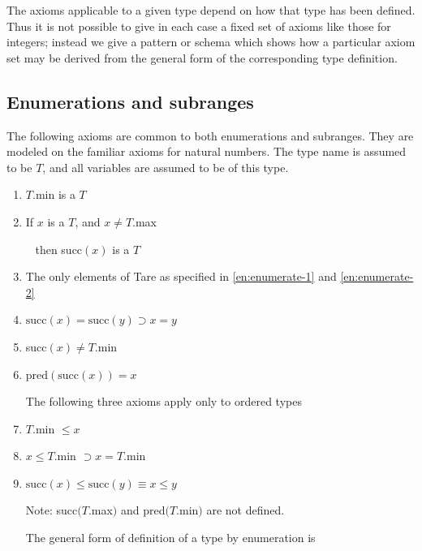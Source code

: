 \documentclass[twoside,11pt]{book}
\begin{document}
The axioms applicable to a given type depend on how that type has been defined. Thus it is not possible to give in each case a fixed set of axioms like those for integers; instead we give a pattern or schema which shows how a particular axiom set may be derived from the general form of the corresponding type definition.

\subsection{Enumerations and subranges}

The following axioms are common to both enumerations and subranges. They are modeled on the familiar axioms for natural numbers. The type name is assumed to be $T$, and all variables are assumed to be of this type.

\begin{enumerate}[wide, nosep, label=(\arabic*)]
	\item \label{en:enumerate-1}
	$T$.min is a $T$
	
	\item \label{en:enumerate-2}
	If $x$ is a $T$, and $x\neq T$.max

	\qquad~ then succ$(x)$ is a $T$

	\item The only elements of Tare as specified in \ref{en:enumerate-1} and \ref{en:enumerate-2}

	\item $\text{succ}(x) = \text{succ}(y) \supset x = y$

	\item succ$(x) \neq T$.min

	\item $\text{pred}(\text{succ}(x)) = x$

	\noindent
	The following three axioms apply only to ordered types

	\setcounter{enumi}{6}
	\item $T$.min $\leqslant x$

	\item $x \leqslant T$.min $\supset x = T$.min

	\item \label{en:enumerate-9}
	$\text{succ}(x) \leqslant \text{succ}(y) \equiv x \leqslant y$

	\noindent
	Note: succ$(T$.max$)$ and pred$(T$.min$)$ are not defined.

	The general form of definition of a type by enumeration is


\end{enumerate}
\end{document}
